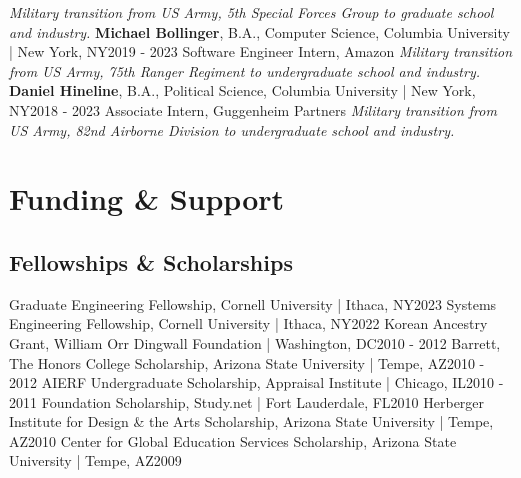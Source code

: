 \documentclass{article}
\begin{document}
        \textit{Military transition from US Army, 5th Special Forces Group to graduate school and industry.}\newline\newline
        \textbf{Michael Bollinger}, B.A., Computer Science, Columbia University | New York, NY\hfill{2019 - 2023}\newline
        Software Engineer Intern, Amazon\newline
        \textit{Military transition from US Army, 75th Ranger Regiment to undergraduate school and industry.}\newline\newline
        \textbf{Daniel Hineline}, B.A., Political Science, Columbia University | New York, NY\hfill{2018 - 2023}\newline
        Associate Intern, Guggenheim Partners\newline
        \textit{Military transition from US Army, 82nd Airborne Division to undergraduate school and industry.}
    \section*{Funding \& Support}
    \subsection*{Fellowships \& Scholarships}
        Graduate Engineering Fellowship, Cornell University | Ithaca, NY\hfill{2023}\newline %
        Systems Engineering Fellowship, Cornell University | Ithaca, NY\hfill{2022}\newline %
        Korean Ancestry Grant, William Orr Dingwall Foundation | Washington, DC\hfill{2010 - 2012}\newline %
        Barrett, The Honors College Scholarship, Arizona State University | Tempe, AZ\hfill{2010 - 2012}\newline %
        AIERF Undergraduate Scholarship, Appraisal Institute | Chicago, IL\hfill{2010 - 2011}\newline %
        Foundation Scholarship, Study.net | Fort Lauderdale, FL\hfill{2010}\newline %
        Herberger Institute for Design \& the Arts Scholarship, Arizona State University | Tempe, AZ\hfill{2010}\newline %
        Center for Global Education Services Scholarship, Arizona State University | Tempe, AZ\hfill{2009} %
\end{document}
